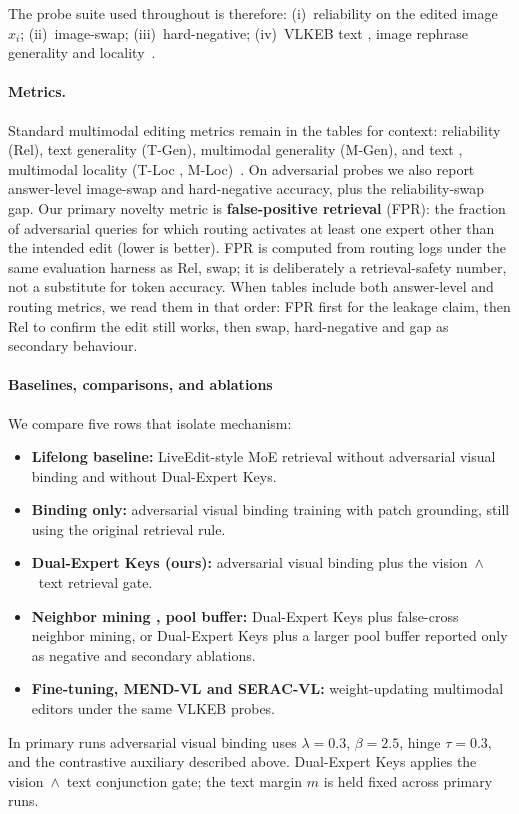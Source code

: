 \documentclass[letterpaper]{article} %
\begin{document}
The probe suite used throughout is therefore:
(i)~reliability on the edited image $x_i$;
(ii)~image-swap;
(iii)~hard-negative;
(iv)~VLKEB text , image rephrase generality and locality~\cite{huang2024vlkeb,chen2025liveedit}.

\paragraph{Metrics.}
Standard multimodal editing metrics remain in the tables for context: reliability (Rel), text generality (T-Gen), multimodal generality (M-Gen), and text , multimodal locality (T-Loc , M-Loc)~\cite{cheng2023mmedit,huang2024vlkeb}.
On adversarial probes we also report answer-level image-swap and hard-negative accuracy, plus the reliability-swap gap.
Our primary novelty metric is \textbf{false-positive retrieval} (FPR): the fraction of adversarial queries for which routing activates at least one expert other than the intended edit (lower is better).
FPR is computed from routing logs under the same evaluation harness as Rel, swap; it is deliberately a retrieval-safety number, not a substitute for token accuracy.
When tables include both answer-level and routing metrics, we read them in that order: FPR first for the leakage claim, then Rel to confirm the edit still works, then swap, hard-negative and gap as secondary behaviour.

\paragraph{Baselines, comparisons, and ablations}
We compare five rows that isolate mechanism:
\begin{itemize}
\item \textbf{Lifelong baseline:} LiveEdit-style MoE retrieval without adversarial visual binding and without Dual-Expert Keys.
\item \textbf{Binding only:} adversarial visual binding training with patch grounding, still using the original retrieval rule.
\item \textbf{Dual-Expert Keys (ours):} adversarial visual binding plus the vision~$\wedge$~text retrieval gate.
\item \textbf{Neighbor mining , pool buffer:} Dual-Expert Keys plus false-cross neighbor mining, or Dual-Expert Keys plus a larger pool buffer reported only as negative and secondary ablations.
\item \textbf{Fine-tuning, MEND-VL and SERAC-VL:} weight-updating multimodal editors under the same VLKEB probes.
\end{itemize}
In primary runs adversarial visual binding uses $\lambda{=}0.3$, $\beta{=}2.5$, hinge $\tau{=}0.3$, and the contrastive auxiliary described above.
Dual-Expert Keys applies the vision~$\wedge$~text conjunction gate; the text margin $m$ is held fixed across primary runs.
\end{document}
